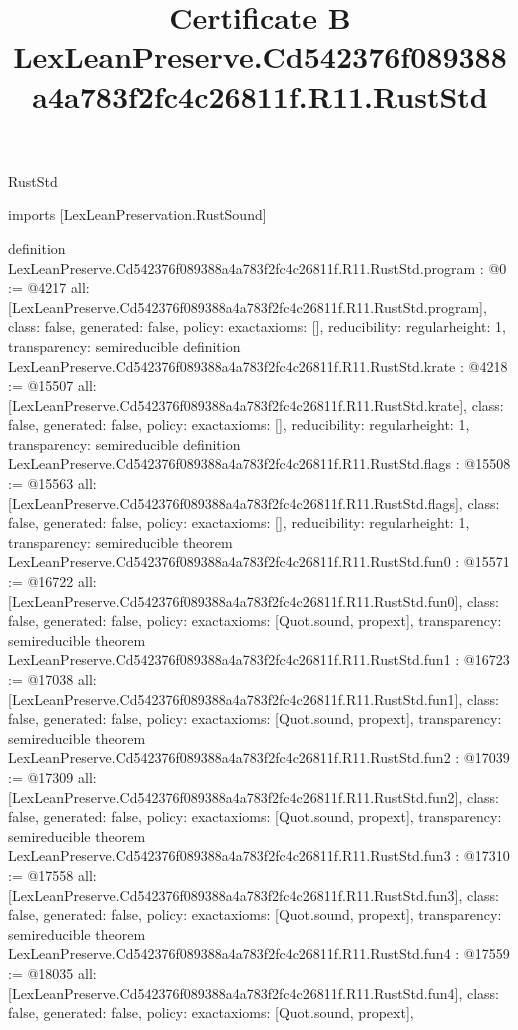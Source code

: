 \begin{lexlean}{RustStd}
\title{Certificate B LexLeanPreserve.Cd542376f089388a4a783f2fc4c26811f.R11.RustStd}
\begin{coremodule}
imports [LexLeanPreservation.RustSound]

definition LexLeanPreserve.Cd542376f089388a4a783f2fc4c26811f.R11.RustStd.program : @0 := @4217 {
  all: [LexLeanPreserve.Cd542376f089388a4a783f2fc4c26811f.R11.RustStd.program],
  class: false,
  generated: false,
  policy: exact{axioms: []},
  reducibility: regular{height: 1},
  transparency: semireducible
}
definition LexLeanPreserve.Cd542376f089388a4a783f2fc4c26811f.R11.RustStd.krate : @4218 := @15507 {
  all: [LexLeanPreserve.Cd542376f089388a4a783f2fc4c26811f.R11.RustStd.krate],
  class: false,
  generated: false,
  policy: exact{axioms: []},
  reducibility: regular{height: 1},
  transparency: semireducible
}
definition LexLeanPreserve.Cd542376f089388a4a783f2fc4c26811f.R11.RustStd.flags : @15508 := @15563 {
  all: [LexLeanPreserve.Cd542376f089388a4a783f2fc4c26811f.R11.RustStd.flags],
  class: false,
  generated: false,
  policy: exact{axioms: []},
  reducibility: regular{height: 1},
  transparency: semireducible
}
theorem LexLeanPreserve.Cd542376f089388a4a783f2fc4c26811f.R11.RustStd.fun0 : @15571 := @16722 {
  all: [LexLeanPreserve.Cd542376f089388a4a783f2fc4c26811f.R11.RustStd.fun0],
  class: false,
  generated: false,
  policy: exact{axioms: [Quot.sound, propext]},
  transparency: semireducible
}
theorem LexLeanPreserve.Cd542376f089388a4a783f2fc4c26811f.R11.RustStd.fun1 : @16723 := @17038 {
  all: [LexLeanPreserve.Cd542376f089388a4a783f2fc4c26811f.R11.RustStd.fun1],
  class: false,
  generated: false,
  policy: exact{axioms: [Quot.sound, propext]},
  transparency: semireducible
}
theorem LexLeanPreserve.Cd542376f089388a4a783f2fc4c26811f.R11.RustStd.fun2 : @17039 := @17309 {
  all: [LexLeanPreserve.Cd542376f089388a4a783f2fc4c26811f.R11.RustStd.fun2],
  class: false,
  generated: false,
  policy: exact{axioms: [Quot.sound, propext]},
  transparency: semireducible
}
theorem LexLeanPreserve.Cd542376f089388a4a783f2fc4c26811f.R11.RustStd.fun3 : @17310 := @17558 {
  all: [LexLeanPreserve.Cd542376f089388a4a783f2fc4c26811f.R11.RustStd.fun3],
  class: false,
  generated: false,
  policy: exact{axioms: [Quot.sound, propext]},
  transparency: semireducible
}
theorem LexLeanPreserve.Cd542376f089388a4a783f2fc4c26811f.R11.RustStd.fun4 : @17559 := @18035 {
  all: [LexLeanPreserve.Cd542376f089388a4a783f2fc4c26811f.R11.RustStd.fun4],
  class: false,
  generated: false,
  policy: exact{axioms: [Quot.sound, propext]},
}
\end{coremodule}
\end{lexlean}
